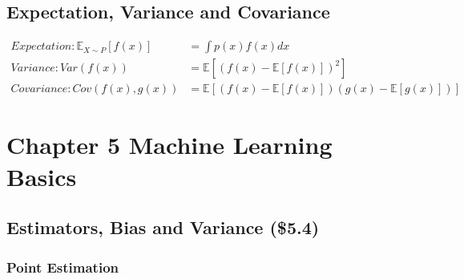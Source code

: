 \documentclass[12pt]{article}
\numberwithin{equation}{section}
\begin{document}
\subsection{Expectation, Variance and Covariance}
\begin{equation}\begin{split}
	Expectation: \mathbb{E}_{X \sim P}[f(x)]&=\int p(x)f(x)dx \\
	Variance: Var(f(x))&=\mathbb{E}[(f(x)-\mathbb{E}[f(x)])^2] \\
	Covariance: Cov(f(x),g(x))&=\mathbb{E}[(f(x)-\mathbb{E}[f(x)])(g(x)-\mathbb{E}[g(x)])]
\end{split}\end{equation}
\section{Chapter 5 Machine Learning Basics}
\subsection{Estimators, Bias and Variance (\$5.4)}
\subsubsection{Point Estimation}
\end{document}
